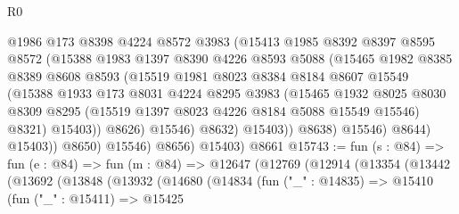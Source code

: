 \begin{lexlean}{R0}
\begin{coremodule}
                          @1986
                          @173
                          @8398
                          @4224
                          @8572
                          @3983
                          (@15413
                            @1985
                            @8392
                            @8397
                            @8595
                            @8572
                            (@15388
                              @1983
                              @1397
                              @8390
                              @4226
                              @8593
                              @5088
                              (@15465
                                @1982
                                @8385
                                @8389
                                @8608
                                @8593
                                (@15519
                                  @1981
                                  @8023
                                  @8384
                                  @8184
                                  @8607
                                  @15549
                                  (@15388
                                    @1933
                                    @173
                                    @8031
                                    @4224
                                    @8295
                                    @3983
                                    (@15465
                                      @1932
                                      @8025
                                      @8030
                                      @8309
                                      @8295
                                      (@15519 @1397 @8023 @4226 @8184 @5088 @15549 @15546)
                                      @8321)
                                    @15403))
                                @8626)
                              @15546)
                            @8632)
                          @15403))
                      @8638)
                    @15546)
                  @8644)
                @15403))
            @8650)
          @15546)
        @8656)
      @15403)
    @8661
@15743 := fun (s : @84) =>
  fun (e : @84) =>
  fun (m : @84) =>
  @12647
    (@12769
      (@12914
        (@13354
          (@13442
            (@13692
              (@13848
                (@13932
                  (@14680
                    (@14834
                      (fun ("_" : @14835) =>
                      @15410
                        (fun ("_" : @15411) =>
                        @15425

\end{coremodule}
\end{lexlean}
